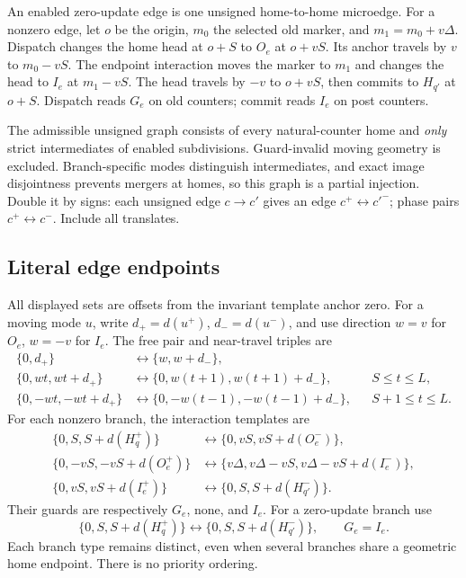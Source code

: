 \documentclass[11pt,a4paper]{article}
\numberwithin{equation}{section}
\begin{document}
An enabled zero-update edge is one unsigned home-to-home microedge. For a nonzero edge, let $o$ be the origin, $m_0$ the selected old marker, and $m_1=m_0+v\Delta$. Dispatch changes the home head at $o+S$ to $O_e$ at $o+vS$. Its anchor travels by $v$ to $m_0-vS$. The endpoint interaction moves the marker to $m_1$ and changes the head to $I_e$ at $m_1-vS$. The head travels by $-v$ to $o+vS$, then commits to $H_{q'}$ at $o+S$. Dispatch reads $G_e$ on old counters; commit reads $I_e$ on post counters.

The admissible unsigned graph consists of every natural-counter home and \emph{only} strict intermediates of enabled subdivisions. Guard-invalid moving geometry is excluded. Branch-specific modes distinguish intermediates, and exact image disjointness prevents mergers at homes, so this graph is a partial injection. Double it by signs: each unsigned edge $c\to c'$ gives an edge $c^+\leftrightarrow c'^-$; phase pairs $c^+\leftrightarrow c^-$. Include all translates.

\subsection{Literal edge endpoints}
All displayed sets are offsets from the invariant template anchor zero. For a moving mode $u$, write $d_+=d(u^+)$, $d_-=d(u^-)$, and use direction $w=v$ for $O_e$, $w=-v$ for $I_e$. The free pair and near-travel triples are
\begin{align}
\{0,d_+\}&\longleftrightarrow\{w,w+d_-\},\label{fpa:sw:eq:free}\\
\{0,wt,wt+d_+\}&\longleftrightarrow
\{0,w(t+1),w(t+1)+d_-\},&&S\le t\le L,\label{fpa:sw:eq:behind}\\
\{0,-wt,-wt+d_+\}&\longleftrightarrow
\{0,-w(t-1),-w(t-1)+d_-\},&&S+1\le t\le L.\label{fpa:sw:eq:ahead}
\end{align}
For each nonzero branch, the interaction templates are
\begin{align}
\{0,S,S+d(H_q^+)\}&\longleftrightarrow
\{0,vS,vS+d(O_e^-)\},\label{fpa:sw:eq:dispatch}\\
\{0,-vS,-vS+d(O_e^+)\}&\longleftrightarrow
\{v\Delta,v\Delta-vS,v\Delta-vS+d(I_e^-)\},\label{fpa:sw:eq:endpoint}\\
\{0,vS,vS+d(I_e^+)\}&\longleftrightarrow
\{0,S,S+d(H_{q'}^-)\}.\label{fpa:sw:eq:commit}
\end{align}
Their guards are respectively $G_e$, none, and $I_e$. For a zero-update branch use
\begin{equation}\label{fpa:sw:eq:direct}
\{0,S,S+d(H_q^+)\}\longleftrightarrow
\{0,S,S+d(H_{q'}^-)\},\qquad G_e=I_e.
\end{equation}
Each branch type remains distinct, even when several branches share a geometric home endpoint. There is no priority ordering.
\end{document}
